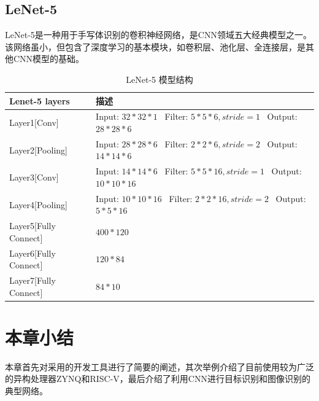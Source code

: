     \subsection{LeNet-5}
    LeNet-5是一种用于手写体识别的卷积神经网络，是CNN领域五大经典模型之一。该网络虽小，但包含了深度学习的基本模块，如卷积层、池化层、全连接层，是其他CNN模型的基础。
    \begin{table}[h] %
        \centering
        \caption{LeNet-5 模型结构} %
        \begin{tabular}{l|l} %
        \hline  
        Lenet-5 layers & 描述 \\
        \hline %
        Layer1[Conv] & Input: $32*32*1$ \  Filter: $5*5*6, stride=1$ \  Output: $28*28*6$ \\
        \hline  
        Layer2[Pooling] & Input: $28*28*6$ \  Filter: $2*2*6, stride=2$ \  Output: $14*14*6$ \\
        \hline  
        Layer3[Conv] & Input: $14*14*6$ \  Filter: $5*5*16, stride=1$ \  Output: $10*10*16$ \\
        \hline  
        Layer4[Pooling] & Input: $10*10*16$ \  Filter: $2*2*16, stride=2$ \  Output: $5*5*16$ \\
        \hline  
        Layer5[Fully Connect] & $400*120$ \\
        \hline  
        Layer6[Fully Connect] & $120*84$ \\
        \hline  
        Layer7[Fully Connect] & $84*10$  \\
        \hline  
        \end{tabular}  
    \end{table}


\section{本章小结}
本章首先对采用的开发工具进行了简要的阐述，其次举例介绍了目前使用较为广泛的异构处理器ZYNQ和RISC-V，最后介绍了利用CNN进行目标识别和图像识别的典型网络。



